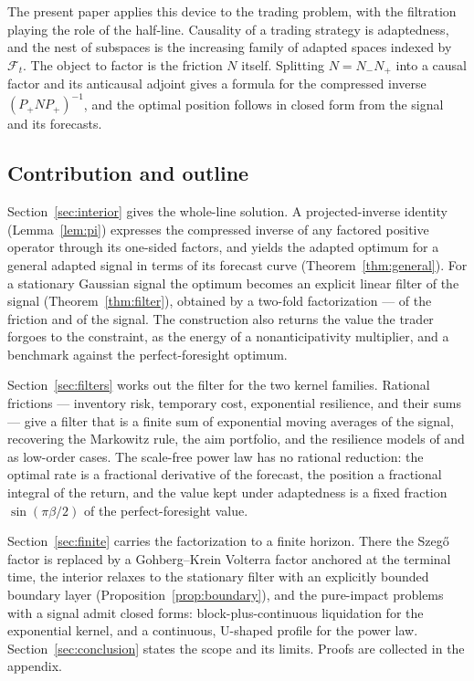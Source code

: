 \documentclass[11pt]{article}
\newcommand{\F}{\mathcal{F}}
\theoremstyle{plain}
\theoremstyle{definition}
\theoremstyle{remark}
\begin{document}
The present paper applies this device to the trading problem, with the filtration playing the role of the half-line. Causality of a trading strategy is adaptedness, and the nest of subspaces is the increasing family of adapted spaces indexed by $\F_t$. The object to factor is the friction $N$ itself. Splitting $N=N_-N_+$ into a causal factor and its anticausal adjoint gives a formula for the compressed inverse $(P_+NP_+)^{-1}$, and the optimal position follows in closed form from the signal and its forecasts.

\subsection{Contribution and outline}\label{sec:contribution}

Section~\ref{sec:interior} gives the whole-line solution. A projected-inverse identity (Lemma~\ref{lem:pi}) expresses the compressed inverse of any factored positive operator through its one-sided factors, and yields the adapted optimum for a general adapted signal in terms of its forecast curve (Theorem~\ref{thm:general}). For a stationary Gaussian signal the optimum becomes an explicit linear filter of the signal (Theorem~\ref{thm:filter}), obtained by a two-fold factorization --- of the friction and of the signal. The construction also returns the value the trader forgoes to the constraint, as the energy of a nonanticipativity multiplier, and a benchmark against the perfect-foresight optimum.

Section~\ref{sec:filters} works out the filter for the two kernel families. Rational frictions --- inventory risk, temporary cost, exponential resilience, and their sums --- give a filter that is a finite sum of exponential moving averages of the signal, recovering the Markowitz rule, the aim portfolio, and the resilience models of \citet{LehalleNeuman2019} and \citet{NeumanVoss2022} as low-order cases. The scale-free power law has no rational reduction: the optimal rate is a fractional derivative of the forecast, the position a fractional integral of the return, and the value kept under adaptedness is a fixed fraction $\sin(\pi\beta/2)$ of the perfect-foresight value.

Section~\ref{sec:finite} carries the factorization to a finite horizon. There the Szeg\H{o} factor is replaced by a Gohberg--Krein Volterra factor anchored at the terminal time, the interior relaxes to the stationary filter with an explicitly bounded boundary layer (Proposition~\ref{prop:boundary}), and the pure-impact problems with a signal admit closed forms: block-plus-continuous liquidation for the exponential kernel, and a continuous, U-shaped profile for the power law. Section~\ref{sec:conclusion} states the scope and its limits. Proofs are collected in the appendix.
\end{document}
